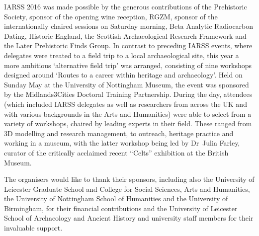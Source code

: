 IARSS 2016 was made possible by the generous contributions of the Prehistoric Society, sponsor of the opening wine reception, 
RGZM, 
sponsor of the internationally chaired sessions on Saturday morning, 
Beta Analytic Radiocarbon Dating, Historic England, the Scottish Archaeological Research Framework and the Later Prehistoric Finds Group. 
In contrast to preceding IARSS events, where delegates were treated to a field trip to a local archaeological site, this year a more ambitious ‘alternative field trip’ was arranged, consisting of nine workshops designed around ‘Routes to a career within heritage and archaeology’. 
Held on Sunday  May at the University of Nottingham Museum, the event was sponsored by the Midlands3Cities Doctoral Training Partnership. 
During the day, attendees (which included IARSS delegates as well as researchers from across the UK and with various backgrounds in the Arts and Humanities) were able to select from a variety of workshops, chaired by leading experts in their field. These ranged from 3D modelling and research management, to outreach, heritage practice and working in a museum, with the latter workshop being led by Dr~Julia Farley, curator of the critically acclaimed recent \enquote{Celts} exhibition at the British Museum.

The organisers would like to thank their sponsors, including also the University of Leicester Graduate School and College for Social Sciences, Arts and Humanities, the University of Nottingham School of Humanities and the University of Birmingham, for their financial contributions and the University of Leicester School of Archaeology and Ancient History and university staff members for their invaluable support. 


\IJSRAclosing%
%